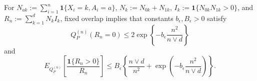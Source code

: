 For \(N_{ak}:=\sum_{i=1}^n\mathbf 1\{X_i=k,A_i=a\}\), \(N_k:=N_{0k}+N_{1k}\), \(I_k:=\mathbf 1\{N_{0k}N_{1k}>0\}\), and \(R_n:=\sum_{k=1}^dN_kI_k\), fixed overlap implies that constants \(b_{\epsilon},B_{\epsilon}>0\) satisfy
\[
 Q_P^{(n)}(R_n=0)\le2\exp\left\{-b_{\epsilon}\frac{n^2}{n\vee d}\right\}
\]
and
\[
 E_{Q_P^{(n)}}\left[\frac{\mathbf 1\{R_n>0\}}{R_n}\right]
 \le B_{\epsilon}\left\{\frac{n\vee d}{n^2}+\exp\left(-b_{\epsilon}\frac{n^2}{n\vee d}\right)\right\}.
\]